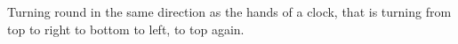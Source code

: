 Turning round in the same direction as the hands of a clock, that is turning 
from top to right to bottom to left, to top again.